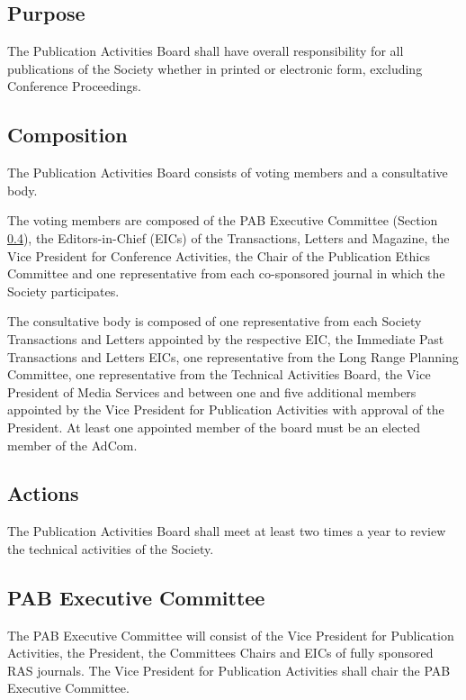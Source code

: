 \documentclass[10pt]{article}
\newcommand{\secref}[1]{Section \ref{#1}}
\begin{document}
\subsection{Purpose}
The Publication Activities Board shall have overall responsibility for all publications of the Society whether in printed or electronic form, excluding Conference Proceedings.  




\subsection{Composition}

The Publication Activities Board consists of voting members and a consultative body. 

The voting members are composed of the PAB Executive Committee (\secref{PAB:ExCom}), the Editors-in-Chief (EICs) of the Transactions, Letters and Magazine, the Vice President for Conference Activities, the Chair of the Publication Ethics Committee and one representative from each co-sponsored journal in which the Society participates. 

The consultative body is composed of one representative from each Society Transactions and Letters appointed by the respective EIC, the Immediate Past Transactions and Letters EICs, one representative from the Long Range Planning Committee, one representative from the Technical Activities Board, the Vice President of Media Services and between one and five additional  members appointed by the Vice President for Publication Activities with approval of the President. At least one appointed member of the board must be an elected member of the AdCom.


\subsection{Actions}

The Publication Activities Board shall meet at least two times a year to review the technical activities of the Society.

\subsection{PAB Executive Committee}
\label{PAB:ExCom}

The PAB Executive Committee will consist of the Vice President for Publication Activities, the President, the Committees Chairs and EICs of fully sponsored RAS journals. The Vice President for Publication Activities shall chair the PAB Executive Committee.
\end{document}
